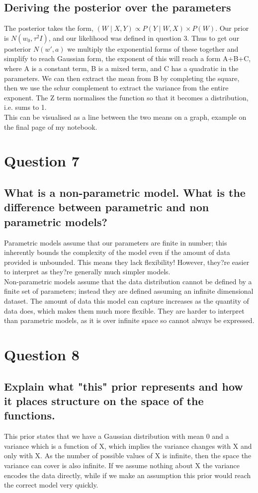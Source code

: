 \documentclass[a4paper, 9pt]{article}
\begin{document}
\subsection*{Deriving the posterior over the parameters}
The posterior takes the form, \( (W \mid X, Y) \propto P(Y \mid W, X) \times P(W) \). Our prior is \( N(w_{0} ,\tau^{2} I) \), and our likelihood was defined in question 3. Thus to get our posterior \( N(w', a) \) we multiply the exponential forms of these together and simplify to reach Gaussian form, the exponent of this will reach a form A+B+C, where A is a constant term, B is a mixed term, and C has a quadratic in the parameters. We can then extract the mean from B by completing the square, then we use the schur complement to extract the variance from the entire exponent. The Z term normalises the function so that it becomes a distribution, i.e. sums to 1.  \\
This can be visualised as a line between the two means on a graph, example on the final page of my notebook.

\section*{Question 7}
\subsection*{What is a non-parametric model. What is the difference between parametric and non parametric models?}
Parametric models assume that our parameters are finite in number; this inherently bounds the complexity of the model even if the amount of data provided is unbounded. This means they lack flexibility! However, they?re easier to interpret as they?re generally much simpler models. \\
Non-parametric models assume that the data distribution cannot be defined by a finite set of parameters; instead they are defined assuming an infinite dimensional dataset. The amount of data this model can capture increases as the quantity of data does, which makes them much more flexible. They are harder to interpret than parametric models, as it is over infinite space so cannot always be expressed. 

\section*{Question 8}
\subsection*{Explain what "this" prior represents and how it places structure on the space of the functions.}
This prior states that we have a Gaussian distribution with mean 0 and a variance which is a function of X, which implies the variance changes with X and only with X. As the number of possible values of X is infinite, then the space the variance can cover is also infinite. If we assume nothing about X the variance encodes the data directly, while if we make an assumption this prior would reach the correct model very quickly.
\end{document}
